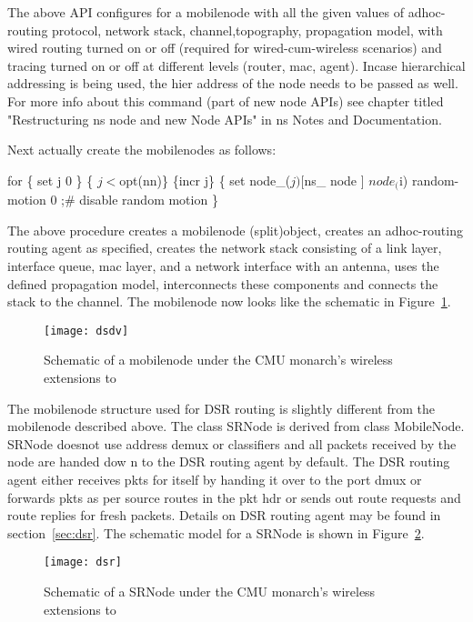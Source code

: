 The above API configures for a mobilenode with all the given values of adhoc-routing protocol, network stack, channel,topography, propagation model, with wired routing turned on or off (required for wired-cum-wireless scenarios) and tracing turned on or off at different levels (router, mac, agent). Incase hierarchical addressing is being used, the hier address of the node needs to be passed as well. For more info about this command (part of new node APIs) see chapter titled "Restructuring ns node and new Node APIs" in ns Notes and Documentation.

Next actually create the mobilenodes as follows:
\begin{program}
for \{ set j 0 \} \{ $j < $opt(nn)\} \{incr j\} \{
    set node_($j) [ $ns_ node ]
    $node_($i) random-motion 0		;# disable random motion
\}
\end{program} %

The above procedure creates a mobilenode (split)object, creates an adhoc-routing routing agent as specified, creates the network stack consisting of a link layer, interface queue, mac layer, and a network interface with an antenna, uses the defined propagation model, interconnects these components and connects the stack to the channel. The mobilenode now looks like the schematic in Figure~\ref{fig:mobilenode-dsdv}.  
\begin{figure}
    \centerline{\texttt{[image: dsdv]}}
    \caption{Schematic of a mobilenode under the CMU monarch's
      wireless extensions to \ns} 
    \label{fig:mobilenode-dsdv} 
\end{figure}

The mobilenode structure used for DSR routing is slightly different from
the mobilenode described above. The class SRNode is derived from class
MobileNode. SRNode doesnot use address demux or classifiers and all
packets received by the node are handed dow   
n to the DSR routing agent by default. The DSR routing agent either
receives pkts for itself by handing it over to the port dmux or forwards
pkts as per source routes in the pkt hdr or sends out route requests and
route replies for fresh packets. Details    
on DSR routing agent may be found in section~\ref{sec:dsr}. The schematic
model for a SRNode is shown in Figure~\ref{fig:mobilenode-dsr}. 
\begin{figure}[tb]
    \centerline{\texttt{[image: dsr]}}
    \caption{Schematic of a SRNode under the CMU monarch's wireless
      extensions to \ns} 
    \label{fig:mobilenode-dsr}
\end{figure}

